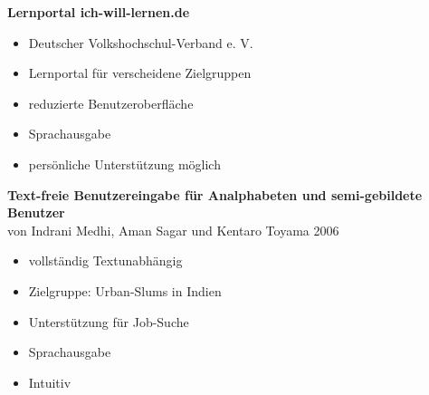 \documentclass{handout}
\begin{document}
\textbf{Lernportal ich-will-lernen.de} 
	\begin{itemize}
		\item Deutscher Volkshochschul-Verband e. V.
		\item Lernportal für verscheidene Zielgruppen
                        \item reduzierte Benutzeroberfläche
                        \item Sprachausgabe
		\item persönliche Unterstützung möglich
	\end{itemize}		 

\textbf{Text-freie Benutzereingabe für Analphabeten und semi-gebildete Benutzer} \\
 von Indrani Medhi, Aman Sagar und Kentaro Toyama 2006
	\begin{itemize}
		\item vollständig Textunabhängig
		\item Zielgruppe: Urban-Slums in Indien
                        \item Unterstützung für Job-Suche
                        \item Sprachausgabe
		\item Intuitiv
	\end{itemize}
\end{document}
